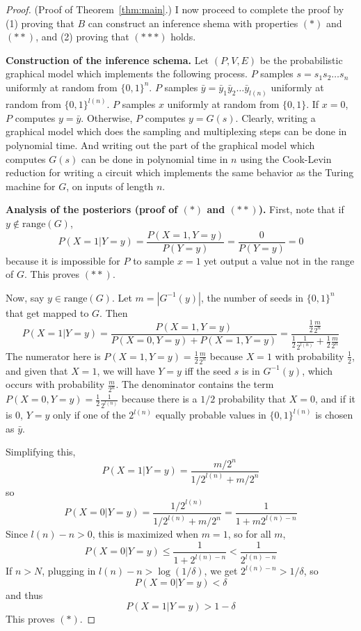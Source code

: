 \documentclass{article}
\theoremstyle{definition}
\theoremstyle{remark}
\begin{document}
\begin{proof}{(Proof of Theorem~\ref{thm:main}.)}
I now proceed to complete the proof by (1) proving that $B$ can construct an inference shema with properties $(*)$ and $(**)$, and (2) proving that $(***)$ holds.

\medskip
\noindent \textbf{Construction of the inference schema.}
Let $(P, V, E)$ be the probabilistic graphical model which implements the following process.
$P$ samples $s = s_1 s_2 \dots s_n$ uniformly at random from $\{0, 1\}^n$.
$P$ samples $\bar{y} = \bar{y}_1 \bar{y}_2 \dots \bar{y}_{l(n)}$ uniformly at random from $\{0, 1\}^{l(n)}$.
$P$ samples $x$ uniformly at random from $\{0, 1\}$.
If $x = 0$, $P$ computes $y = \bar{y}$.
Otherwise, $P$ computes $y = G(s)$.
Clearly, writing a graphical model which does the sampling and multiplexing steps can be done in polynomial time.
And writing out the part of the graphical model which computes $G(s)$ can be done in polynomial time in $n$ using the Cook-Levin reduction for writing a circuit which implements the same behavior as the Turing machine for $G$, on inputs of length $n$.

\medskip
\noindent \textbf{Analysis of the posteriors (proof of $(*)$ and $(**)$).}
First, note that if $y \notin \text{range}(G)$,
$$
P(X = 1 | Y = y) = \frac{P(X = 1, Y = y)}{P(Y = y)} = \frac{0}{P(Y = y)} = 0
$$
because it is impossible for $P$ to sample $x = 1$ yet output a value not in the range of $G$.
This proves $(**)$.

Now, say $y \in \text{range}(G)$.
Let $m = |G^{-1}(y)|$, the number of seeds in $\{0, 1\}^n$ that get mapped to $G$.
Then
$$
P(X = 1 | Y = y) = \frac{P(X = 1, Y = y)}{P(X = 0, Y = y) + P(X = 1, Y = y)}
= \frac{
    \frac{1}{2} \frac{m}{2^n}
}{
    \frac{1}{2} \frac{1}{2^{l(n)}} + \frac{1}{2} \frac{m}{2^n}
}
$$
The numerator here is $P(X = 1, Y = y) = \frac{1}{2} \frac{m}{2^n}$ 
because $X = 1$ with probability $\frac{1}{2}$, and given that $X = 1$, we will have $Y = y$ iff the seed $s$ is in $G^{-1}(y)$, which occurs with probability $\frac{m}{2^n}$.
The denominator contains the term $P(X = 0, Y = y) = \frac{1}{2} \frac{1}{2^{l(n)}}$ because there is a $1/2$ probability that $X = 0$, and if it is $0$, $Y = y$ only if one of the $2^{l(n)}$ equally probable values in $\{0, 1\}^{l(n)}$ is chosen as $\bar{y}$.

Simplifying this, 
$$
P(X = 1 | Y = y) = \frac{
    m/2^n
}{
    1/2^{l(n)} + m/2^n
}
$$
so
$$
P(X = 0 | Y = y) = \frac{
    1/2^{l(n)}
}{
    1/2^{l(n)} + m/2^n
} = \frac{1}{1 + m 2^{l(n) - n}}
$$
Since $l(n) - n > 0$, this is maximized when $m = 1$, so for all $m$,
$$
P(X = 0 | Y = y) \leq \frac{1}{1 + 2^{l(n) - n}} < \frac{1}{2^{l(n) - n}}
$$
If $n > N$, plugging in $l(n) - n > \log(1/\delta)$, we get $2^{l(n) - n} > 1/\delta$, so
$$
P(X = 0 | Y = y) < \delta
$$
and thus
$$
P(X = 1 | Y = y) > 1 - \delta
$$
This proves $(*)$.


\end{proof}
\end{document}
